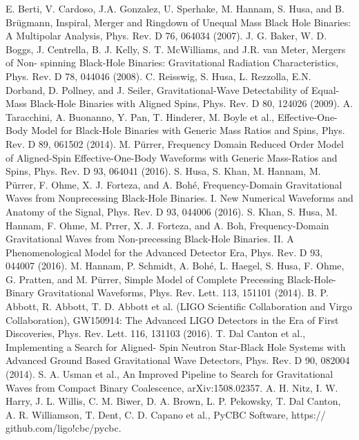 \documentclass[binding=0.6cm, LaM]{sapthesis}
\begin{document}
\begin{thebibliography}{500}
         E. Berti, V. Cardoso, J.A. Gonzalez, U. Sperhake, M. Hannam, S. Husa, and B. Brügmann, Inspiral, Merger and Ringdown of Unequal Mass Black Hole Binaries: A Multipolar Analysis, Phys. Rev. D 76, 064034 (2007).
          J. G. Baker, W. D. Boggs, J. Centrella, B. J. Kelly, S. T. McWilliams, and J.R. van Meter, Mergers of Non- spinning Black-Hole Binaries: Gravitational Radiation Characteristics, Phys. Rev. D 78, 044046 (2008). 
         C. Reisswig, S. Husa, L. Rezzolla, E.N. Dorband, D. Pollney, and J. Seiler, Gravitational-Wave Detectability of Equal-Mass Black-Hole Binaries with Aligned Spins, Phys. Rev. D 80, 124026 (2009). 
    	 A. Taracchini, A. Buonanno, Y. Pan, T. Hinderer, M. Boyle et al., Effective-One-Body Model for Black-Hole Binaries with Generic Mass Ratios and Spins, Phys. Rev. D 89, 061502 (2014).
          M. Pürrer, Frequency Domain Reduced Order Model of Aligned-Spin Effective-One-Body Waveforms with Generic Mass-Ratios and Spins, Phys. Rev. D 93, 064041 (2016). 
         S. Husa, S. Khan, M. Hannam, M. Pürrer, F. Ohme, X. J. Forteza, and A. Bohé, Frequency-Domain Gravitational Waves from Nonprecessing Black-Hole Binaries. I. New Numerical Waveforms and Anatomy of the Signal, Phys. Rev. D 93, 044006 (2016).
           S. Khan, S. Husa, M. Hannam, F. Ohme, M. Prrer, X. J. Forteza, and A. Boh, Frequency-Domain Gravitational Waves from Non-precessing Black-Hole Binaries. II. A Phenomenological Model for the Advanced Detector Era, Phys. Rev. D 93, 044007 (2016).
          M. Hannam, P. Schmidt, A. Bohé, L. Haegel, S. Husa, F. Ohme, G. Pratten, and M. Pürrer, Simple Model of Complete Precessing Black-Hole-Binary Gravitational Waveforms, Phys. Rev. Lett. 113, 151101 (2014).
          B. P. Abbott, R. Abbott, T. D. Abbott et al. (LIGO Scientific Collaboration and Virgo Collaboration), GW150914: The Advanced LIGO Detectors in the Era of First Discoveries, Phys. Rev. Lett. 116, 131103 (2016).
          T. Dal Canton et al., Implementing a Search for Aligned- Spin Neutron Star-Black Hole Systems with Advanced Ground Based Gravitational Wave Detectors, Phys. Rev. D 90, 082004 (2014).
 	 S. A. Usman et al., An Improved Pipeline to Search for Gravitational Waves from Compact Binary Coalescence, arXiv:1508.02357.
         A. H. Nitz, I. W. Harry, J. L. Willis, C. M. Biwer, D. A. Brown, L. P. Pekowsky, T. Dal Canton, A. R. Williamson, T. Dent, C. D. Capano et al., PyCBC Software, https:// github.com/ligo!cbc/pycbc.

\end{thebibliography}
\end{document}
